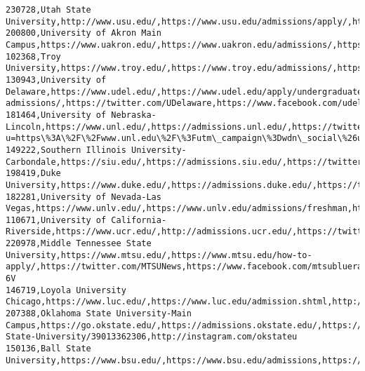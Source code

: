 \documentclass[11pt]{article}
\begin{document}
\begin{Verbatim}[commandchars=\\\{\}]
230728,Utah State University,http://www.usu.edu/,https://www.usu.edu/admissions/apply/,http://twitter.com/USUAggies,http://www.facebook.com/UtahState,http://instagram.com/usuaggielife/
200800,University of Akron Main Campus,https://www.uakron.edu/,https://www.uakron.edu/admissions/,https://twitter.com/uakron,https://www.facebook.com/UniversityofAkron,http://instagram.com/uakron
102368,Troy University,https://www.troy.edu/,https://www.troy.edu/admissions/,https://twitter.com/TROYUNews,https://www.facebook.com/TroyUniversity/,http://instagram.com/troyuniversity
130943,University of Delaware,https://www.udel.edu/,https://www.udel.edu/apply/undergraduate-admissions/,https://twitter.com/UDelaware,https://www.facebook.com/udelaware,https://www.instagram.com/udelaware/
181464,University of Nebraska-Lincoln,https://www.unl.edu/,https://admissions.unl.edu/,https://twitter.com/UNLincoln,https://www.facebook.com/sharer/sharer.php?u=https\%3A\%2F\%2Fwww.unl.edu\%2F\%3Futm\_campaign\%3Dwdn\_social\%26utm\_medium\%3Dshare\_this\%26utm\_source\%3Dwdn\_facebook,https://www.instagram.com/p/BpQRkTaBES9/
149222,Southern Illinois University-Carbondale,https://siu.edu/,https://admissions.siu.edu/,https://twitter.com/SIUCAdmissions,https://www.facebook.com/SIUC.Admissions/,https://www.instagram.com/siucadmissions/
198419,Duke University,https://www.duke.edu/,https://admissions.duke.edu/,https://twitter.com/DukeU,https://www.facebook.com/DukeUniv,http://instagram.com/dukeuniversity
182281,University of Nevada-Las Vegas,https://www.unlv.edu/,https://www.unlv.edu/admissions/freshman,https://twitter.com/UNLV,https://www.facebook.com/OfficialUNLV,https://www.instagram.com/unlv
110671,University of California-Riverside,https://www.ucr.edu/,http://admissions.ucr.edu/,https://twitter.com/UCRiverside,https://www.facebook.com/UCRiverside,https://www.instagram.com/ucriversideofficial/
220978,Middle Tennessee State University,https://www.mtsu.edu/,https://www.mtsu.edu/how-to-apply/,https://twitter.com/MTSUNews,https://www.facebook.com/mtsublueraiders,https://instagram.com/p/BpUrV5eh-6V
146719,Loyola University Chicago,https://www.luc.edu/,https://www.luc.edu/admission.shtml,http://twitter.com/waltertangarife,http://www.facebook.com/LoyolaChicago,http://instagram.com/loyolachicago
207388,Oklahoma State University-Main Campus,https://go.okstate.edu/,https://admissions.okstate.edu/,https://twitter.com/okstate,https://www.facebook.com/pages/Oklahoma-State-University/39013362306,http://instagram.com/okstateu
150136,Ball State University,https://www.bsu.edu/,https://www.bsu.edu/admissions,https://twitter.com/ballstate,https://www.facebook.com/ballstate/,https://www.instagram.com/ballstateuniversity/

\end{Verbatim}
\end{document}
